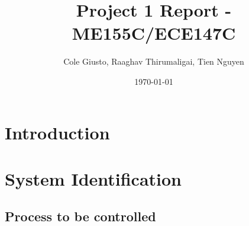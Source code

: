 \documentclass[11pt]{article}
\title{Project 1 Report - ME155C/ECE147C}
\author{Cole Giusto, Raaghav Thirumaligai, Tien Nguyen}
\date{\today}
\begin{document}
\maketitle

\begin{abstract}
%
\end{abstract}

\section{Introduction}



\label{sec:intro}


\section{System Identification}
\label{sec:systemID}


\subsection{Process to be controlled}
\end{document}

